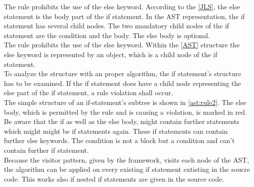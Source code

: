 The rule prohibits the use of the else keyword. According to the \ref{JLS}, the else statement is the body part of the if statement. In the \acf{AST} representation, the if statement has several child nodes. The two mandatory child nodes of the if statement are the condition and the body. The else body is optional. 
\\

The rule prohibits the use of the else keyword. Within the \ref{AST} structure the else keyword is represented by an object, which is a child node of the if statement.
\\

To analyze the structure with an proper algorithm, the if statement's structure has to be examined. If the if statement does have a child node representing the else part of the if statement, a rule violation shall occur.
\\

The simple structure of an if-statement's subtree is shown in \ref{ast:rule2}. The else body, which is permitted by the rule and is causing a violation, is marked in red. 
Be aware that the if as well as the else body, might contain further statements which might might be if statements again. These if statements can contain further else keywords. The condition is not a block but a condition and can't contain further if statement.
\\

Because the visitor pattern, given by the framework, visits each node of the \acf{AST}, the algorithm can be applied on every existing if statement extisting in the soucre code. This works also if nested if statements are given in the source code.
\\

\label{ast:rule2}

